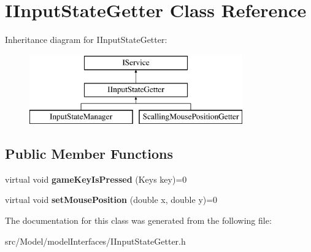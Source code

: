 \hypertarget{classIInputStateGetter}{}\section{I\+Input\+State\+Getter Class Reference}
\label{classIInputStateGetter}
Inheritance diagram for I\+Input\+State\+Getter\+:\begin{figure}[H]
\begin{center}
\leavevmode
\includegraphics[height=3.000000cm]{classIInputStateGetter}
\end{center}
\end{figure}
\subsection*{Public Member Functions}
\begin{DoxyCompactItemize}
\item 
virtual void {\bfseries game\+Key\+Is\+Pressed} (Keys key)=0\hypertarget{classIInputStateGetter_afe4c6eb4febc8aeca2734c36c397e0a2}{}\label{classIInputStateGetter_afe4c6eb4febc8aeca2734c36c397e0a2}

\item 
virtual void {\bfseries set\+Mouse\+Position} (double x, double y)=0\hypertarget{classIInputStateGetter_a51f4228098714ee3ac162966f702b561}{}\label{classIInputStateGetter_a51f4228098714ee3ac162966f702b561}

\end{DoxyCompactItemize}


The documentation for this class was generated from the following file\+:\begin{DoxyCompactItemize}
\item 
src/\+Model/model\+Interfaces/I\+Input\+State\+Getter.\+h\end{DoxyCompactItemize}
